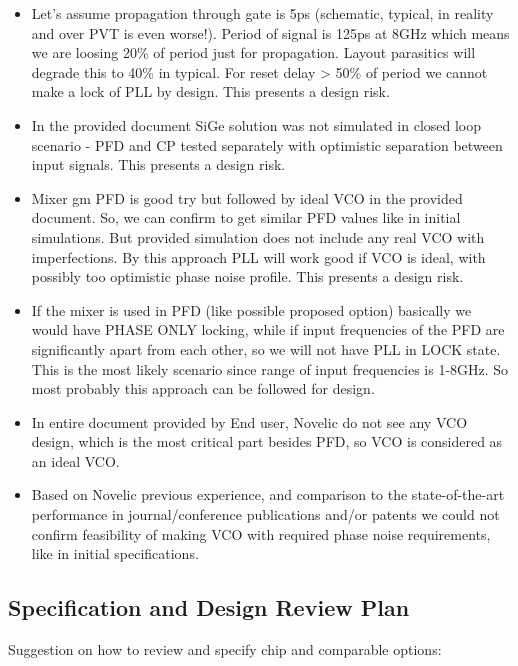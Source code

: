 \documentclass{article}
\begin{document}
\begin{itemize}
	\item Let's assume propagation through gate is 5ps (schematic, typical, in reality and over PVT is even worse!). Period of signal is 125ps at 8GHz which means we are loosing 20\% of period just for propagation. Layout parasitics will degrade this to 40\% in typical. For reset delay > 50\% of period we cannot make a lock of PLL by design. This presents a design risk.
	\item In the provided document SiGe solution was not simulated in closed loop scenario - PFD and CP tested separately with optimistic separation between input signals. This presents a design risk.
	\item Mixer gm PFD is good try but followed by ideal VCO in the provided document.  So, we can confirm to get similar PFD values like in initial simulations. But provided simulation does not include any real VCO with imperfections.  By this approach PLL will work good if VCO is ideal, with possibly too optimistic phase noise profile. This presents a design risk.
	\item If the mixer is used in PFD (like possible proposed option) basically we would have PHASE ONLY locking, while if input frequencies of the PFD are significantly apart from each other, so we will not have PLL in LOCK state. This is the most likely scenario since range of input frequencies is 1-8GHz. So most probably this approach can be followed for design.
	\item In entire document provided by End user, Novelic do not see any VCO design, which is the most critical part besides PFD, so VCO is considered as an ideal VCO.  
	\item Based on Novelic previous experience, and comparison to the state-of-the-art performance in journal/conference publications and/or patents we could not confirm feasibility of making VCO with required phase noise requirements, like in initial specifications. 

\end{itemize}

\newpage

\subsection{Specification and Design Review Plan} %

Suggestion on how to review and specify chip and comparable options:
\end{document}

